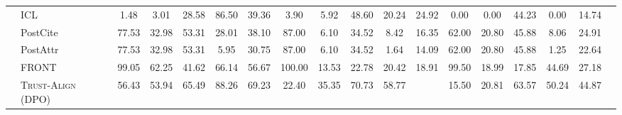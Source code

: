 \documentclass{article} %
\newcommand{\cdashlinelr}[1]{%
  \noalign{\vskip 2mm}  %
  \cdashline{#1}        %
  \noalign{\vskip 2mm}  %
}
\newcommand{\hlinelr}[1]{%
  \noalign{\vskip 2mm}  %
  \hline    
  \noalign{\vskip 2mm}  %
}
\newcommand{\method}[0]{\textsc{Trust-Align}}
\begin{document}
\begin{table}[htb!]
{\begin{tabular}{ll*{16}{c}}
\hlinelr{1-17}
\multirow{6}{*}{\mystack{LLaMA-3}{-8b}}  & ICL & 1.48 & 3.01 & 28.58 &  86.50 & 39.36 & 3.90 & 5.92 & 48.60 & 20.24 & 24.92 & 0.00 & 0.00 & 44.23 & 0.00 & 14.74 \\
 & PostCite & 77.53 & 32.98 & 53.31 & 28.01 & 38.10 & 87.00 & 6.10 & 34.52 & 8.42 & 16.35 & 62.00 & 20.80 & 45.88 & 8.06 & 24.91 \\
 & PostAttr & 77.53 & 32.98 & 53.31 & 5.95 & 30.75 & 87.00 & 6.10 & 34.52 & 1.64 & 14.09 & 62.00 & 20.80 & 45.88 & 1.25 & 22.64 \\
 & FRONT & 99.05 & \cellcolor{lightyellow}62.25 & 41.62 & 66.14 & 56.67 & 100.00 & 13.53 & 22.78 & 20.42 & 18.91 & 99.50 & 18.99 & 17.85 & 44.69 & 27.18 \\
 \cdashlinelr{2-17}
 & \method{} (DPO) & 56.43 & 53.94 & \cellcolor{lightyellow}65.49 & \cellcolor{lightyellow}88.26 & \cellcolor{lightyellow}69.23 & 22.40 & \cellcolor{lightyellow}35.35 & \cellcolor{lightyellow}70.73 & \cellcolor{lightyellow}58.77 &  \cellcolor{lightyellow}{ 54.95} & 15.50 & \cellcolor{lightyellow}20.81 & \cellcolor{lightyellow}63.57 & \cellcolor{lightyellow}50.24 &  \cellcolor{lightyellow}44.87\\
 



\bottomrule
\end{tabular}
}


\end{table}
\end{document}
